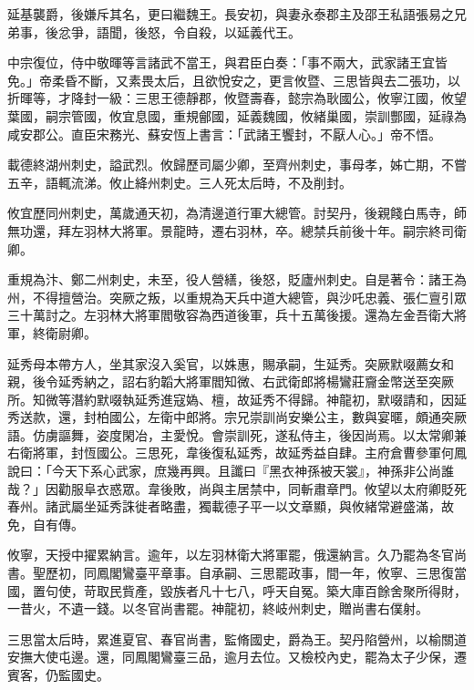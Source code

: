 \begin{pinyinscope}
 延基襲爵，後嫌斥其名，更曰繼魏王。長安初，與妻永泰郡主及邵王私語張易之兄弟事，後忿爭，語聞，後怒，令自殺，以延義代王。



 中宗復位，侍中敬暉等言諸武不當王，與君臣白奏：「事不兩大，武家諸王宜皆免。」帝柔昏不斷，又素畏太后，且欲悅安之，更言攸暨、三思皆與去二張功，以折暉等，才降封一級：三思王德靜郡，攸暨壽春，懿宗為耿國公，攸寧江國，攸望葉國，嗣宗管國，攸宜息國，重規鄶國，延義魏國，攸緒巢國，崇訓酆國，延祿為咸安郡公。直臣宋務光、蘇安恆上書言：「武諸王饗封，不厭人心。」帝不悟。



 載德終湖州刺史，謚武烈。攸歸歷司屬少卿，至齊州刺史，事母孝，姊亡期，不嘗五辛，語輒流涕。攸止絳州刺史。三人死太后時，不及削封。



 攸宜歷同州刺史，萬歲通天初，為清邊道行軍大總管。討契丹，後親餞白馬寺，師無功還，拜左羽林大將軍。景龍時，遷右羽林，卒。總禁兵前後十年。嗣宗終司衛卿。



 重規為汴、鄭二州刺史，未至，役人營繕，後怒，貶廬州刺史。自是著令：諸王為州，不得擅營治。突厥之叛，以重規為天兵中道大總管，與沙吒忠義、張仁亶引眾三十萬討之。左羽林大將軍閻敬容為西道後軍，兵十五萬後援。還為左金吾衛大將軍，終衛尉卿。



 延秀母本帶方人，坐其家沒入奚官，以姝惠，賜承嗣，生延秀。突厥默啜薦女和親，後令延秀納之，詔右豹韜大將軍閻知微、右武衛郎將楊鸞莊齎金幣送至突厥所。知微等潛約默啜執延秀進寇媯、檀，故延秀不得歸。神龍初，默啜請和，因延秀送款，還，封柏國公，左衛中郎將。宗兄崇訓尚安樂公主，數與宴暱，頗通突厥語。仿虜謳舞，姿度閑冶，主愛悅。會崇訓死，遂私侍主，後因尚焉。以太常卿兼右衛將軍，封恆國公。三思死，韋後復私延秀，故延秀益自肆。主府倉曹參軍何鳳說曰：「今天下系心武家，庶幾再興。且讖曰『黑衣神孫被天裳』，神孫非公尚誰哉？」因勸服阜衣惑眾。韋後敗，尚與主居禁中，同斬肅章門。攸望以太府卿貶死春州。諸武屬坐延秀誅徙者略盡，獨載德子平一以文章顯，與攸緒常避盛滿，故免，自有傳。



 攸寧，天授中擢累納言。逾年，以左羽林衛大將軍罷，俄還納言。久乃罷為冬官尚書。聖歷初，同鳳閣鸞臺平章事。自承嗣、三思罷政事，間一年，攸寧、三思復當國，置句使，苛取民貲產，毀族者凡十七八，呼天自冤。築大庫百餘舍聚所得財，一昔火，不遺一錢。以冬官尚書罷。神龍初，終岐州刺史，贈尚書右僕射。



 三思當太后時，累進夏官、春官尚書，監脩國史，爵為王。契丹陷營州，以榆關道安撫大使屯邊。還，同鳳閣鸞臺三品，逾月去位。又檢校內史，罷為太子少保，遷賓客，仍監國史。




\end{pinyinscope}

